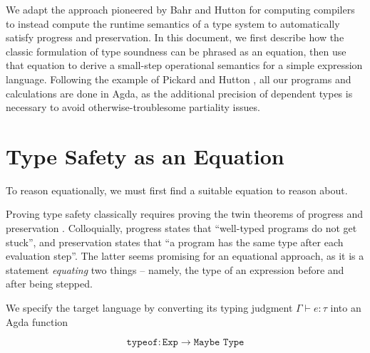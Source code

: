 \documentclass[manuscript,screen,sigplan]{acmart}
\begin{document}


We adapt the approach pioneered by Bahr and Hutton \cite{bahr:2015} for
computing compilers to instead compute the runtime semantics of a type system
to automatically satisfy progress and preservation.
In this document, we first describe how the classic formulation of
type soundness can be phrased as an equation, then use that equation to
derive a small-step operational semantics for a simple expression language.
Following the example of Pickard and Hutton \cite{pickard:2021}, all our
programs and calculations are done in Agda, as the additional precision of
dependent types is necessary to avoid otherwise-troublesome partiality issues.

\section{Type Safety as an Equation}

To reason equationally, we must first find a suitable equation to reason about.

Proving type safety classically requires proving the twin theorems of
progress and preservation \cite{harper:pfpl}. Colloquially, progress states
that ``well-typed programs do not get stuck'', and preservation states that
``a program has the same type after each evaluation step''. The latter seems
promising for an equational approach, as it is a statement \emph{equating} two
things -- namely, the type of an expression before and after being stepped.

We specify the target language by converting its typing judgment $\Gamma
\vdash e : \tau$ into an Agda function

\begin{equation*}
  \texttt{typeof} : \texttt{Exp} \rightarrow \texttt{Maybe Type}
\end{equation*}
\end{document}
